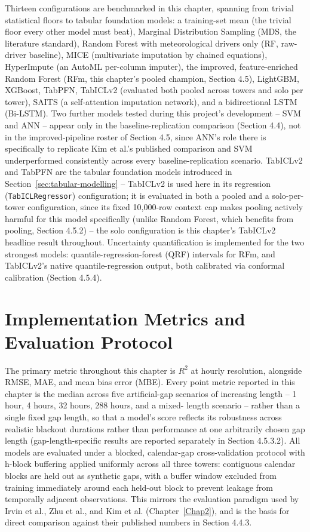 Thirteen configurations are benchmarked in this chapter, spanning from trivial statistical floors to
tabular foundation models: a training-set mean (the trivial floor every other model must beat),
Marginal Distribution Sampling (MDS, the literature standard), Random Forest with meteorological
drivers only (RF, raw-driver baseline), MICE (multivariate imputation by chained equations),
HyperImpute (an AutoML per-column imputer), the improved, feature-enriched Random Forest (RFm, this
chapter's pooled champion, Section 4.5), LightGBM, XGBoost, TabPFN, TabICLv2 (evaluated both pooled
across towers and solo per tower), SAITS (a self-attention imputation network), and a bidirectional
LSTM (Bi-LSTM). Two further models tested during this project's development -- SVM and ANN -- appear
only in the baseline-replication comparison (Section 4.4), not in the improved-pipeline roster of
Section 4.5, since ANN's role there is specifically to replicate Kim et al.'s published comparison
and SVM underperformed consistently across every baseline-replication scenario. TabICLv2 and TabPFN
are the tabular foundation models introduced in Section~\ref{sec:tabular-modelling} -- TabICLv2 is
used here in its regression (\texttt{TabICLRegressor}) configuration; it is evaluated in both a
pooled and a solo-per-tower configuration, since its fixed 10,000-row context cap makes pooling
actively harmful for this model specifically (unlike Random Forest, which benefits from pooling,
Section 4.5.2) -- the solo configuration is this chapter's TabICLv2 headline result throughout.
Uncertainty quantification is implemented for the two strongest models: quantile-regression-forest
(QRF) intervals for RFm, and TabICLv2's native quantile-regression output, both calibrated via
conformal calibration (Section 4.5.4).

\section{Implementation Metrics and Evaluation Protocol}

The primary metric throughout this chapter is $R^2$ at hourly resolution, alongside RMSE, MAE, and
mean bias error (MBE). Every point metric reported in this chapter is the median across five
artificial-gap scenarios of increasing length -- 1 hour, 4 hours, 32 hours, 288 hours, and a mixed-
length scenario -- rather than a single fixed gap length, so that a model's score reflects its
robustness across realistic blackout durations rather than performance at one arbitrarily chosen gap
length (gap-length-specific results are reported separately in Section 4.5.3.2). All models are
evaluated under a blocked, calendar-gap cross-validation protocol with h-block buffering applied
uniformly across all three towers: contiguous calendar blocks are held out as synthetic gaps, with a
buffer window excluded from training immediately around each held-out block to prevent leakage from
temporally adjacent observations. This mirrors the evaluation paradigm used by Irvin et al., Zhu et
al., and Kim et al. (Chapter~\ref{Chap2}), and is the basis for direct comparison against their
published numbers in Section 4.4.3.

